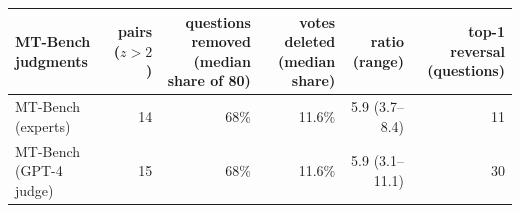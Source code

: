 \begin{tabular}{lrrrrr}\toprule
MT-Bench judgments & pairs ($z{>}2$) & questions removed (median share of 80) & votes deleted (median share) & ratio (range) & top-1 reversal (questions) \\\midrule
MT-Bench (experts) & 14 & 68\% & 11.6\% & 5.9 (3.7--8.4) & 11 \\
MT-Bench (GPT-4 judge) & 15 & 68\% & 11.6\% & 5.9 (3.1--11.1) & 30 \\
\bottomrule\end{tabular}
